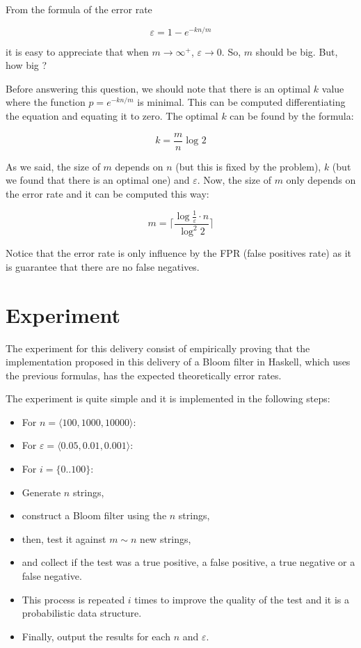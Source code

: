 \documentclass[12pt, a4paper]{article} %
\begin{document}
From the formula of the error rate

\[
  \varepsilon = 1 - e^{-kn/m}
\]

it is easy to appreciate that when $m \to \infty^+$, $\varepsilon \to 0$. So, $m$ should be big. But, how big ?

Before answering this question, we should note that there is an optimal $k$ value where the function $p = e^{-kn/m}$ is minimal. This can be computed differentiating the equation and equating it to zero. The optimal $k$ can be found by the formula:

\[
  k = \frac{m}{n}\log_{} 2
\]

As we said, the size of $m$ depends on $n$ (but this is fixed by the problem), $k$ (but we found that there is an optimal one) and $\varepsilon$. Now, the size of $m$ only depends on the error rate and it can be computed this way:

\[
  m = \lceil \frac{\log \frac{1}{\varepsilon} \cdot n}{\log^2 2} \rceil
\]

Notice that the error rate is only influence by the FPR (false positives rate) as it is guarantee that there are no false negatives.

\section{Experiment}\label{s:experiment}

The experiment for this delivery consist of empirically proving that the implementation proposed in this delivery of a Bloom filter in Haskell, which uses the previous formulas, has the expected theoretically error rates.

The experiment is quite simple and it is implemented in the following steps:

\begin{itemize}
  \item For $n = \langle 100, 1000, 10000\rangle$:
  \item For $\varepsilon = \langle 0.05, 0.01, 0.001\rangle$:
  \item For $i = \{0..100\}$:
  \item Generate $n$ strings,
  \item construct a Bloom filter using the $n$ strings,
  \item then, test it against $m \sim n$ new strings,
  \item and collect if the test was a true positive, a false positive, a true negative or a false negative.
  \item This process is repeated $i$ times to improve the quality of the test and it is a probabilistic data structure.
  \item Finally, output the results for each $n$ and $\varepsilon$.
\end{itemize}
\end{document}
